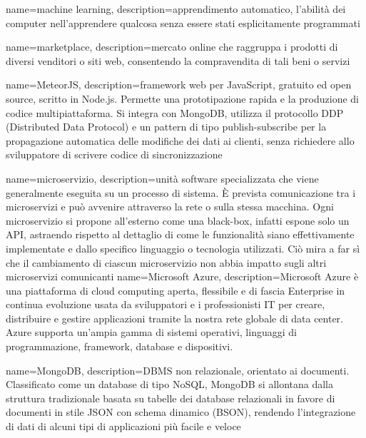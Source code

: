 

{
	name=machine learning,
	description={apprendimento automatico, l'abilità dei computer nell'apprendere qualcosa senza essere stati esplicitamente programmati}
}	

{
	name=marketplace,
	description={mercato online che raggruppa i prodotti di diversi venditori o siti web, consentendo la compravendita di tali beni o servizi}
}

{
	name=MeteorJS,
	description={framework web per JavaScript, gratuito ed open source, scritto in Node.js. Permette una prototipazione rapida e la produzione di codice multipiattaforma. Si integra con MongoDB, utilizza il protocollo DDP (Distributed Data Protocol) e un pattern di tipo publish-subscribe per la propagazione automatica delle modifiche dei dati ai clienti, senza richiedere allo sviluppatore di scrivere codice di sincronizzazione}
}		

{
	name=microservizio,
	description={unità software specializzata che viene generalmente eseguita su un processo di sistema. \MakeUppercase{è} prevista comunicazione tra i microservizi e può avvenire attraverso la rete o sulla stessa macchina. Ogni microservizio si propone all’esterno come una black-box, infatti espone solo un API, astraendo rispetto al dettaglio di come le funzionalità siano effettivamente implementate e dallo specifico linguaggio o tecnologia utilizzati. Ciò mira a far sì che il cambiamento di ciascun microservizio non abbia impatto sugli altri microservizi comunicanti}
}
{
	name=Microsoft Azure,
	description={Microsoft Azure è una piattaforma di cloud computing aperta, flessibile e di fascia Enterprise in continua evoluzione usata da sviluppatori e i professionisti IT per creare, distribuire e gestire applicazioni tramite la nostra rete globale di data center. Azure supporta un'ampia gamma di sistemi operativi, linguaggi di programmazione, framework, database e dispositivi.}
}			

{
	name=MongoDB,
	description={DBMS non relazionale, orientato ai documenti. Classificato come un database di tipo NoSQL, MongoDB si allontana dalla struttura tradizionale basata su tabelle dei database relazionali in favore di documenti in stile JSON con schema dinamico (BSON), rendendo l'integrazione di dati di alcuni tipi di applicazioni più facile e veloce}
}	

